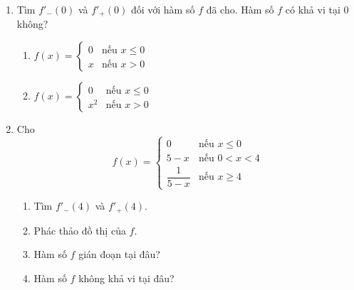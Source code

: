 \documentclass[10pt,letterpaper]{article}
\begin{document}
\fontsize{9}{12}\selectfont

\noindent
\begin{minipage}[t]{0.485\textwidth}
\begin{enumerate}[label=\textbf{\arabic*.}, leftmargin=1.5em, start=64, itemsep=6pt, topsep=0pt]
    \item Tìm $f'_-(0)$ và $f'_+(0)$ đối với hàm số $f$ đã cho. Hàm số $f$ có khả vi tại $0$ không?
    \begin{enumerate}[label=(\alph*), leftmargin=1.6em, itemsep=2pt, topsep=2pt]
        \item $f(x) = \begin{cases} 
            0 & \text{nếu } x \leqslant 0 \\ 
            x & \text{nếu } x > 0 
        \end{cases}$
        \item $f(x) = \begin{cases} 
            0 & \text{nếu } x \leqslant 0 \\ 
            x^2 & \text{nếu } x > 0 
        \end{cases}$
    \end{enumerate}

    \item Cho
    \[
    f(x) = \begin{cases} 
        0 & \text{nếu } x \leqslant 0 \\ 
        5 - x & \text{nếu } 0 < x < 4 \\ 
        \dfrac{1}{5-x} & \text{nếu } x \geqslant 4 
    \end{cases}
    \]
    \begin{enumerate}[label=(\alph*), leftmargin=1.6em, itemsep=1.5pt, topsep=2pt]
        \item Tìm $f'_-(4)$ và $f'_+(4)$.
        \item Phác thảo đồ thị của $f$.
        \item Hàm số $f$ gián đoạn tại đâu?
        \item Hàm số $f$ không khả vi tại đâu?
    \end{enumerate}
\end{enumerate}

\vspace{6pt}
\noindent{\color{stewartcyan}\rule{\linewidth}{0.8pt}}
\end{minipage}%
\end{document}
